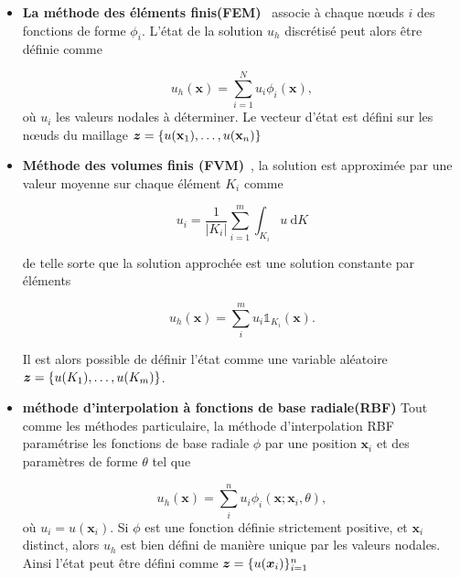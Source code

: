 \begin{itemize}

    \item \textbf{La méthode des éléments finis(FEM)}~\cite{fem} associe à chaque nœuds $i$ des fonctions de forme $\phi_i$.
          L'état de la solution \(u_h\) discrétisé peut alors être définie comme

          \begin{equation*}
              u_h(\bm x) = \sum_{i=1}^{N} u_i \phi_i(\bm x),
          \end{equation*}où $u_i$ les valeurs nodales à déterminer. Le vecteur d'état est défini sur les nœuds du maillage $\bm z = \{ u(\mathbf{x}_1), \dots, u(\mathbf{x}_n)\}$

    \item \textbf{Méthode des volumes finis (FVM)}~\cite{fvm}, la solution est approximée par une valeur moyenne sur chaque élément $K_i$ comme

          \begin{equation*}
              u_i = \frac{1}{\lvert K_i \rvert}\sum_{i=1}^{m} \int_{K_i} u~\text{d}K
          \end{equation*}

          de telle sorte que la solution approchée est une solution constante par éléments

          \begin{equation*}
              u_h(\bm x) = \sum_i^m u_i \mathbb{1}_{K_i}(\bm x).
          \end{equation*}

          Il est alors possible de définir l'état comme une variable aléatoire  $\bm z = \{ u(K_1), \dots, u(K_m)\}$.

    \item \textbf{méthode d'interpolation à fonctions de base radiale(RBF)} Tout comme les méthodes particulaire, la méthode d'interpolation RBF paramétrise les fonctions de base radiale $\phi$ par une position $\bm x_i$ et des paramètres de forme $\theta$ tel que

          \begin{equation*}
              u_h(\bm x) = \sum_{i}^n u_i \phi_i(\bm x; \bm x_i, \theta),
          \end{equation*}où $u_i = u(\bm x_i)$. Si $\phi$ est une fonction définie strictement positive, et $\bm x_i$ distinct, alors $u_h$ est bien défini de manière unique par les valeurs nodales. Ainsi l'état peut être défini comme $\bm z = \{ u(\bm{x}_i) \}_{i=1}^{n}$
\end{itemize}

